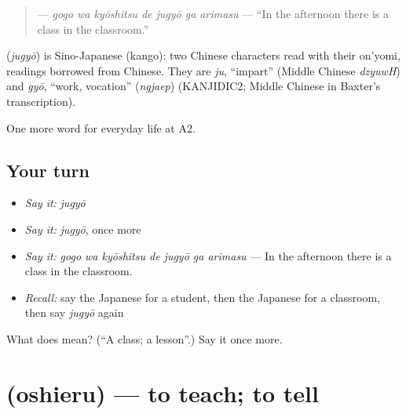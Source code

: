 \begin{quote}
\textbf{   } — \emph{gogo wa kyōshitsu de jugyō ga arimasu} — \textquotedblleft{}In the afternoon there is a class in the classroom.\textquotedblright{}
\end{quote}

\begin{cousinweb}
\textbf{} (\emph{jugyō}) is Sino-Japanese (kango): two Chinese characters read with their on'yomi, readings borrowed from Chinese. They are \emph{ju}, \textquotedblleft{}impart\textquotedblright{} (Middle Chinese \emph{dzyuwH}) and \emph{gyō}, \textquotedblleft{}work, vocation\textquotedblright{} (\emph{ngjaep}) (KANJIDIC2; Middle Chinese in Baxter's transcription).
\end{cousinweb}

\begin{grammarlens}[title={What you've built}]
One more word for everyday life at A2.
\end{grammarlens}

\subsection*{Your turn}
\begin{itemize}
\raggedright
  \item \emph{Say it:} \emph{jugyō}
  \item \emph{Say it:} \emph{jugyō}, once more
  \item \emph{Say it:} \emph{gogo wa kyōshitsu de jugyō ga arimasu} — In the afternoon there is a class in the classroom.
  \item \emph{Recall:} say the Japanese for a student, then the Japanese for a classroom, then say \emph{jugyō} again
\end{itemize}

\begin{tcolorbox}[breakable,colback=teal!4,colframe=teal!35!black,title={Before you move on}]
What does  mean? (\textquotedblleft{}A class; a lesson\textquotedblright{}.) Say it once more.
\end{tcolorbox}
\section[\texorpdfstring{\ja{おしえる} (oshieru)}{おしえる (oshieru)}]{ (oshieru) — to teach; to tell}

\label{lesson:JA-C224-oshieru}



